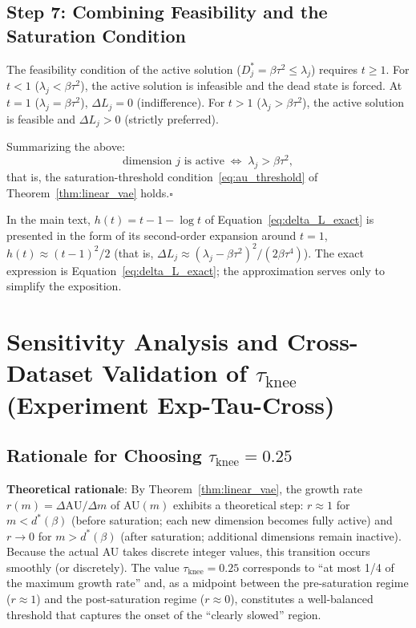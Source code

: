 \documentclass[make,article,submit,pdftex,moreauthors]{Definitions/mdpi}
\begin{document}
\subsection*{Step 7: Combining Feasibility and the Saturation Condition}

The feasibility condition of the active solution
($D_j^* = \beta\tau^2 \leq \lambda_j$) requires $t \geq 1$.
For $t < 1$ ($\lambda_j < \beta\tau^2$), the active solution is infeasible and
the dead state is forced.
At $t = 1$ ($\lambda_j = \beta\tau^2$), $\Delta L_j = 0$ (indifference).
For $t > 1$ ($\lambda_j > \beta\tau^2$), the active solution is feasible and
$\Delta L_j > 0$ (strictly preferred).

Summarizing the above:
\begin{equation}
  \text{dimension }j\text{ is active} \;\Longleftrightarrow\; \lambda_j > \beta\tau^2,
\end{equation}
that is, the saturation-threshold condition~\eqref{eq:au_threshold} of
Theorem~\ref{thm:linear_vae} holds.\hfill$\square$

\begin{Remark}
In the main text, $h(t) = t - 1 - \log t$ of
Equation~\eqref{eq:delta_L_exact} is presented in the form of its second-order
expansion around $t = 1$,
$h(t) \approx (t-1)^2/2$
(that is, $\Delta L_j \approx (\lambda_j - \beta\tau^2)^2/(2\beta\tau^4)$).
The exact expression is Equation~\eqref{eq:delta_L_exact}; the approximation
serves only to simplify the exposition.
\end{Remark}

\section[\appendixname~\thesection]{Sensitivity Analysis and Cross-Dataset Validation of $\tau_{\mathrm{knee}}$ (Experiment Exp-Tau-Cross)}\label{app:tau_knee}

\subsection*{Rationale for Choosing $\tau_{\mathrm{knee}} = 0.25$}

\textbf{Theoretical rationale}:
By Theorem~\ref{thm:linear_vae}, the growth rate
$r(m) = \Delta\mathrm{AU}/\Delta m$ of AU$(m)$ exhibits a theoretical step:
$r \approx 1$ for $m < d^*(\beta)$ (before saturation; each new dimension becomes
fully active) and $r \to 0$ for $m > d^*(\beta)$ (after saturation; additional
dimensions remain inactive).
Because the actual AU takes discrete integer values, this transition occurs
smoothly (or discretely).
The value $\tau_{\mathrm{knee}} = 0.25$ corresponds to ``at most 1/4 of the
maximum growth rate'' and, as a midpoint between the pre-saturation regime
($r \approx 1$) and the post-saturation regime ($r \approx 0$), constitutes a
well-balanced threshold that captures the onset of the ``clearly slowed''
region.
\end{document}
